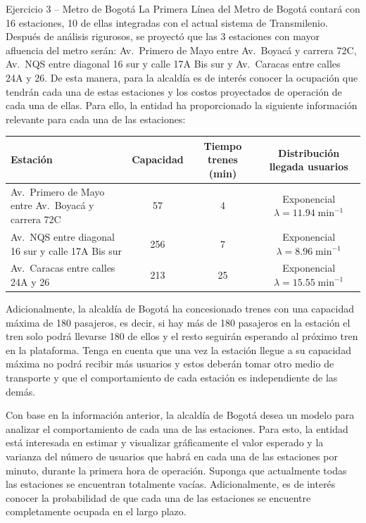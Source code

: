 \documentclass[aspectratio=1610, 9pt]{beamer}
\begin{document}
\begin{frame}{Ejercicio 3 -- Metro de Bogotá}
\footnotesize
La Primera Línea del Metro de Bogotá contará con 16 estaciones, 10 de ellas integradas con el actual sistema de Transmilenio. Después de análisis rigurosos, se proyectó que las 3 estaciones con mayor afluencia del metro serán: Av.\ Primero de Mayo entre Av.\ Boyacá y carrera 72C, Av.\ NQS entre diagonal 16 sur y calle 17A Bis sur y Av.\ Caracas entre calles 24A y 26. De esta manera, para la alcaldía es de interés conocer la ocupación que tendrán cada una de estas estaciones y los costos proyectados de operación de cada una de ellas. Para ello, la entidad ha proporcionado la siguiente información relevante para cada una de las estaciones:

\medskip
\begin{center}
\scriptsize
\begin{tabular}{lccc}
\toprule
\textbf{Estación} & \textbf{Capacidad} & \textbf{Tiempo trenes (min)} & \textbf{Distribución llegada usuarios} \\
\midrule
Av.\ Primero de Mayo entre Av.\ Boyacá y carrera 72C & 57 & 4 & Exponencial $\lambda = 11.94\;\text{min}^{-1}$ \\
Av.\ NQS entre diagonal 16 sur y calle 17A Bis sur & 256 & 7 & Exponencial $\lambda = 8.96\;\text{min}^{-1}$ \\
Av.\ Caracas entre calles 24A y 26 & 213 & 25 & Exponencial $\lambda = 15.55\;\text{min}^{-1}$ \\
\bottomrule
\end{tabular}
\end{center}

\medskip
Adicionalmente, la alcaldía de Bogotá ha concesionado trenes con una capacidad máxima de 180 pasajeros, es decir, si hay más de 180 pasajeros en la estación el tren solo podrá llevarse 180 de ellos y el resto seguirán esperando al próximo tren en la plataforma. Tenga en cuenta que una vez la estación llegue a su capacidad máxima no podrá recibir más usuarios y estos deberán tomar otro medio de transporte y que el comportamiento de cada estación es independiente de las demás.

\medskip
Con base en la información anterior, la alcaldía de Bogotá desea un modelo para analizar el comportamiento de cada una de las estaciones. Para esto, la entidad está interesada en estimar y visualizar gráficamente el valor esperado y la varianza del número de usuarios que habrá en cada una de las estaciones por minuto, durante la primera hora de operación. Suponga que actualmente todas las estaciones se encuentran totalmente vacías. Adicionalmente, es de interés conocer la probabilidad de que cada una de las estaciones se encuentre completamente ocupada en el largo plazo.
\end{frame}
\end{document}
